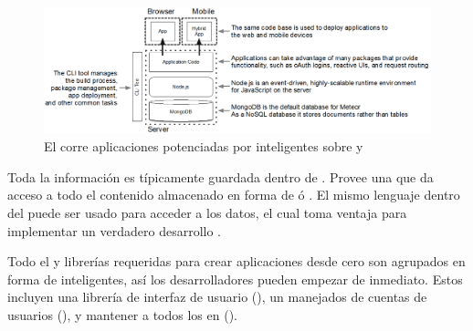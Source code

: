 \begin{figure}[h!]
	\centering
	\includegraphics[width=1.0\textwidth]{figuras/meteor_stack.png}
	\caption{El \stack \meteor corre aplicaciones potenciadas por \packages inteligentes sobre \nodejsNAME y \mongodbNAME}
	\label{figure:meteor_stack}
\end{figure}

Toda la información es típicamente guardada dentro de \mongodbNAME. Provee una \api \javaScriptNAME que da acceso a todo el contenido almacenado en forma de \documentsDB ó \objects. El mismo lenguaje dentro del \browser puede ser usado para acceder a los datos, el cual \meteor toma ventaja para implementar un verdadero desarrollo \fullstack.

Todo el \software y librerías requeridas para crear aplicaciones \web desde cero son agrupados en forma de \packages inteligentes, así los desarrolladores pueden empezar de inmediato. Estos \packages incluyen una librería de interfaz de usuario (\blazemeteor), un manejados de cuentas de usuarios (\accountsmeteor), y mantener a todos los \clientsAS \reactively \updated en \realTimeINT (\trackermeteor).

